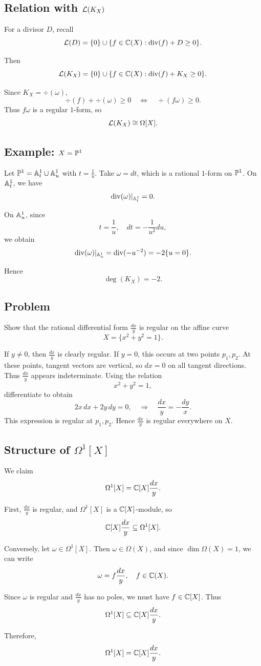 \subsection*{Relation with $\Ell(K_X)$}

For a divisor $D$, recall
\[
    \Ell(D) = \{0\} \cup \{f \in \c(X) : \div(f) + D \geq 0\}.
\]

Then
\[
    \Ell(K_X)
    = \{0\} \cup \{f \in \c(X) : \div(f) + K_X \geq 0\}.
\]

Since $K_X = \div(\omega)$,
\[
    \div(f) + \div(\omega) \geq 0
    \quad \Longleftrightarrow \quad
    \div(f\omega) \geq 0.
\]
Thus $f\omega$ is a regular $1$-form, so
\[
    \Ell(K_X) \cong \Omega[X].
\]

\subsection*{Example: $X = \pp^1$}

Let $\pp^1 = \aa^1_t \cup \aa^1_u$ with $t = \frac{1}{u}$.
Take $\omega = dt$, which is a rational $1$-form on $\pp^1$.
On $\aa^1_t$, we have
\[
    \div(\omega)|_{\aa^1_t} = 0.
\]

On $\aa^1_u$, since
\[
    t = \frac{1}{u},
    \quad
    dt = -\frac{1}{u^2} du,
\]
we obtain
\[
    \div(\omega)|_{\aa^1_u} = \div(-u^{-2}) = -2\{u=0\}.
\]

Hence
\[
    \deg(K_X) = -2.
\]

\subsection*{Problem}

Show that the rational differential form $\frac{dx}{y}$ is regular on the affine curve
\[
    X = \{x^2 + y^2 = 1\}.
\]

If $y \neq 0$, then $\frac{dx}{y}$ is clearly regular.
If $y = 0$, this occurs at two points $p_1,p_2$.
At these points, tangent vectors are vertical, so $dx = 0$ on all tangent directions.
Thus $\frac{dx}{y}$ appears indeterminate.
Using the relation
\[
    x^2 + y^2 = 1,
\]
differentiate to obtain
\[
    2x\,dx + 2y\,dy = 0,
    \quad
    \Rightarrow \quad
    \frac{dx}{y} = -\frac{dy}{x}.
\]
This expression is regular at $p_1,p_2$.
Hence $\frac{dx}{y}$ is regular everywhere on $X$.

\subsection*{Structure of $\Omega^1[X]$}

We claim
\[
    \Omega^1[X] = \c[X]\frac{dx}{y}.
\]

First, $\frac{dx}{y}$ is regular, and $\Omega^1[X]$ is a $\c[X]$-module, so
\[
    \c[X]\frac{dx}{y} \subseteq \Omega^1[X].
\]

Conversely, let $\omega \in \Omega^1[X]$.
Then $\omega \in \Omega(X)$, and since $\dim \Omega(X) = 1$, we can write
\[
    \omega = f \frac{dx}{y},
    \quad
    f \in \c(X).
\]

Since $\omega$ is regular and $\frac{dx}{y}$ has no poles, we must have $f \in \c[X]$.
Thus
\[
    \Omega^1[X] \subseteq \c[X]\frac{dx}{y}.
\]

Therefore,
\[
    \Omega^1[X] = \c[X]\frac{dx}{y}.
\]